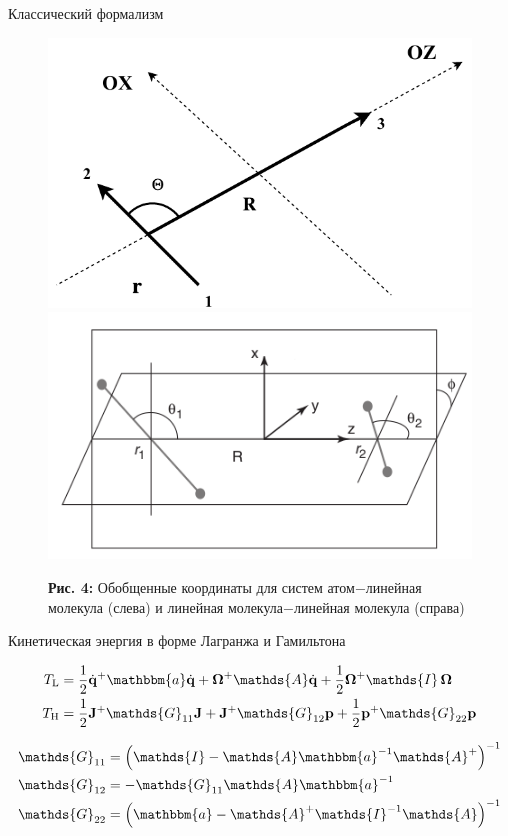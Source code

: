 \documentclass[10pt,usenames,pdf,hyperref={unicode},dvipsnames]{beamer}
\newcommand{\lb}{\left(}
\newcommand{\rb}{\right)}
\newcommand{\mf}{\mathbf}
\newcommand{\mycaption}[2]{
    \textbf{#1:} #2
}
\newcommand{\bOmega}{\boldsymbol{\Omega}}
\newcommand{\Tl}{T_\text{L}}
\newcommand{\Th}{T_\text{H}}
\newcommand{\bba}{\mathbbm{a}}
\newcommand{\bbA}{\mathds{A}}
\newcommand{\bbI}{\mathds{I}}
\newcommand{\bbG}{\mathds{G}}
\begin{document}
\begin{frame}{Классический формализм}
    \vspace*{-0.5cm}
    \begin{figure}[H]
        \includegraphics[width=0.49\linewidth]{./pictures/triatom_coordinates.pdf}
        \includegraphics[width=0.49\linewidth]{./pictures/n2n2_coordinate_frame.png}
        \mycaption{Рис. 4}{Обобщенные координаты для систем атом$-$линейная молекула (слева) и линейная молекула$-$линейная молекула (справа)}
    \end{figure}
    \vspace*{-0.3cm}
    \begin{block}{Кинетическая энергия в форме Лагранжа и Гамильтона}
        \vspace*{-0.3cm}
        \begin{minipage}{0.6\linewidth}
            \begin{gather}
                \begin{aligned}
                    \Tl &= \frac{1}{2} \dot{\mf{q}}^+ \bba \dot{\mf{q}} + \bOmega^+ \bbA \dot{\mf{q}} + \frac{1}{2} \bOmega^+ \bbI \, \bOmega \\
                    \Th &= \frac{1}{2} \mf{J}^+ \bbG_{11} \mf{J} + \mf{J}^+ \bbG_{12} \mf{p} + \frac{1}{2} \mf{p}^+ \bbG_{22} \mf{p}
                \end{aligned} \notag
            \end{gather}
        \end{minipage}
        \begin{minipage}{0.39\linewidth}
            \begin{gather}
                \begin{aligned}
                    \bbG_{11} &= \lb \bbI - \bbA \bba^{-1} \bbA^{+} \rb^{-1} \\
                    \bbG_{12} &= -\bbG_{11} \bbA \bba^{-1} \\
                    \bbG_{22} &= \lb \bba - \bbA^{+} \bbI^{-1} \bbA \rb^{-1}
                \end{aligned} \notag
            \end{gather}
        \end{minipage}
    \end{block}
\end{frame}
\end{document}
